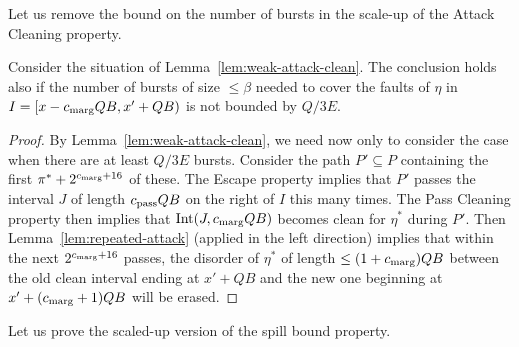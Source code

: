 \documentclass[11pt]{memoir}
\theoremstyle{definition} %
\renewcommand{\le}{\leq}
\def\B{B}
\newcommand{\E}{E} %
\newcommand{\Int}{\mathrm{Int}} %
\newcommand{\passno}{\pi}
\newcommand{\Q}{Q} %
\newcommand{\cns}[1]{c_{\textrm{\upshape #1}}}
\newcommand{\CMarg}{\cns{marg}}
\newcommand{\CPass}{\cns{pass}}
\begin{document}
Let us remove the bound on the number of bursts in the scale-up of the Attack Cleaning property.

\begin{lemma}\label{lem:attack-clean}
  Consider the situation of Lemma~\ref{lem:weak-attack-clean}.
  The conclusion holds also if the number of bursts of size \( \le\beta \) needed to cover the
  faults of \( \eta \) in
  \( I=\lint{x-\CMarg\Q\B}{x'+\Q\B} \) is not bounded by \( \Q/3\E \).
\end{lemma}
\begin{proof}
  By Lemma~\ref{lem:weak-attack-clean}, we need now only to consider the case
  when there are at least \( \Q/3\E \) bursts.
  Consider the path \( P'\subseteq P \) containing the first \( \passno^{*}+2^{\CMarg+16} \) of these.
  The Escape property implies that \( P' \) passes the
  interval \( J \) of length \( \CPass\Q\B \) on the right of \( I \) this many times.
  The Pass Cleaning property then implies that \( \Int(J,\CMarg\Q\B) \) becomes
  clean for \( \eta^{*} \) during \( P' \).
  Then Lemma~\ref{lem:repeated-attack} (applied in the left direction)
  implies that within the next \( 2^{\CMarg+16} \)
  passes, the disorder of \( \eta^{*} \) of length \( \le (1+\CMarg)\Q\B \) between the old clean interval
  ending at \( x'+\Q\B \) and the new one beginning at \( x'+(\CMarg+1)\Q\B \) will be erased.
    \end{proof}

Let us prove the scaled-up version of the spill bound property.
\end{document}
